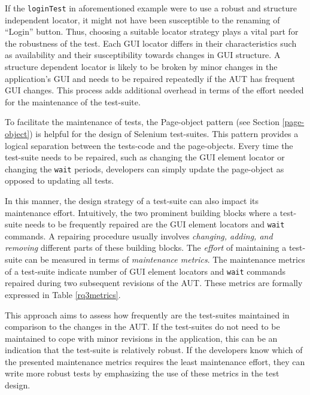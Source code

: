 If the \texttt{loginTest} in aforementioned example were to use a robust and structure independent locator, it might not have been susceptible to the renaming of ``Login'' button. Thus, choosing a suitable locator strategy plays a vital part for the robustness of the test. Each GUI locator differs in their characteristics such as availability and their susceptibility towards changes in GUI structure. A structure dependent locator is likely to be broken by minor changes in the application's GUI and needs to be repaired repeatedly if the AUT has frequent GUI changes. This process adds additional overhead in terms of the effort needed for the maintenance of the test-suite.  

To facilitate the maintenance of tests, the Page-object pattern (see Section \ref{page-object}) is helpful for the design of Selenium test-suites. This pattern provides a logical separation between the tests-code and the page-objects. Every time the test-suite needs to be repaired, such as changing the GUI element locator or changing the \texttt{wait} periods, developers can simply update the page-object as opposed to updating all tests. 

In this manner, the design strategy of a test-suite can also impact its maintenance effort. Intuitively, the two prominent building blocks where a test-suite needs to be frequently repaired are the GUI element locators and \texttt{wait} commands. A repairing procedure usually involves \textit{changing, adding, and removing} different parts of these building blocks. The \textit{effort} of maintaining a test-suite can be measured in terms of \textit{maintenance metrics}. The maintenance metrics of a test-suite indicate number of  GUI element locators and \texttt{wait} commands repaired during two subsequent revisions of the AUT. These metrics are formally expressed in Table \ref{rq3metrics}. 

This approach aims to assess how frequently are the test-suites maintained in comparison to the changes in the AUT. If the test-suites do not need to be maintained to cope with minor revisions in the application, this can be an indication that the test-suite is relatively robust. If the developers know which of the presented maintenance metrics requires the least maintenance effort, they can write more robust tests by emphasizing the use of these metrics in the test design. 

